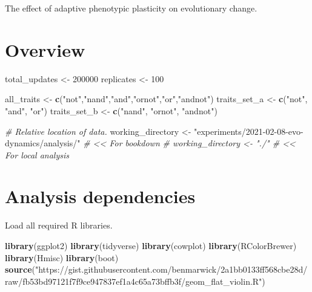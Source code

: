 \documentclass[]{book}
\newenvironment{Shaded}{\begin{snugshade}}{\end{snugshade}}
\newcommand{\CommentTok}[1]{\textcolor[rgb]{0.56,0.35,0.01}{\textit{#1}}}
\newcommand{\DecValTok}[1]{\textcolor[rgb]{0.00,0.00,0.81}{#1}}
\newcommand{\KeywordTok}[1]{\textcolor[rgb]{0.13,0.29,0.53}{\textbf{#1}}}
\newcommand{\NormalTok}[1]{#1}
\newcommand{\StringTok}[1]{\textcolor[rgb]{0.31,0.60,0.02}{#1}}
\begin{document}
The effect of adaptive phenotypic plasticity on evolutionary change.

\hypertarget{overview-1}{%
\section{Overview}\label{overview-1}}

\begin{Shaded}
\begin{Highlighting}[]
\NormalTok{total_updates <-}\StringTok{ }\DecValTok{200000}
\NormalTok{replicates <-}\StringTok{ }\DecValTok{100}

\NormalTok{all_traits <-}\StringTok{ }\KeywordTok{c}\NormalTok{(}\StringTok{"not"}\NormalTok{,}\StringTok{"nand"}\NormalTok{,}\StringTok{"and"}\NormalTok{,}\StringTok{"ornot"}\NormalTok{,}\StringTok{"or"}\NormalTok{,}\StringTok{"andnot"}\NormalTok{)}
\NormalTok{traits_set_a <-}\StringTok{ }\KeywordTok{c}\NormalTok{(}\StringTok{"not"}\NormalTok{, }\StringTok{"and"}\NormalTok{, }\StringTok{"or"}\NormalTok{)}
\NormalTok{traits_set_b <-}\StringTok{ }\KeywordTok{c}\NormalTok{(}\StringTok{"nand"}\NormalTok{, }\StringTok{"ornot"}\NormalTok{, }\StringTok{"andnot"}\NormalTok{)}

\CommentTok{# Relative location of data.}
\NormalTok{working_directory <-}\StringTok{ "experiments/2021-02-08-evo-dynamics/analysis/"} \CommentTok{# << For bookdown}
\CommentTok{# working_directory <- "./"                                              # << For local analysis}
\end{Highlighting}
\end{Shaded}

\hypertarget{analysis-dependencies-1}{%
\section{Analysis dependencies}\label{analysis-dependencies-1}}

Load all required R libraries.

\begin{Shaded}
\begin{Highlighting}[]
\KeywordTok{library}\NormalTok{(ggplot2)}
\KeywordTok{library}\NormalTok{(tidyverse)}
\KeywordTok{library}\NormalTok{(cowplot)}
\KeywordTok{library}\NormalTok{(RColorBrewer)}
\KeywordTok{library}\NormalTok{(Hmisc)}
\KeywordTok{library}\NormalTok{(boot)}
\KeywordTok{source}\NormalTok{(}\StringTok{"https://gist.githubusercontent.com/benmarwick/2a1bb0133ff568cbe28d/raw/fb53bd97121f7f9ce947837ef1a4c65a73bffb3f/geom_flat_violin.R"}\NormalTok{)}
\end{Highlighting}
\end{Shaded}
\end{document}
